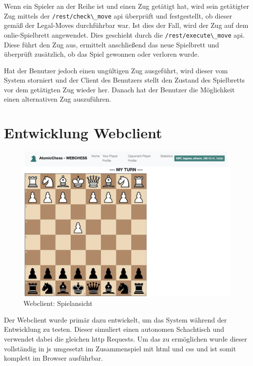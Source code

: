Wenn ein Spieler an der Reihe ist und einen Zug getätigt hat, wird sein
getätigter Zug mittels der \passthrough{\lstinline!/rest/check\_move!}
\gls{api} überprüft und festgestellt, ob dieser gemäß der Legal-Moves
durchführbar war. Ist dies der Fall, wird der Zug auf dem
onlie-Spielbrett angewendet. Dies geschieht durch die
\passthrough{\lstinline!/rest/execute\_move!} \gls{api}. Diese führt den
Zug aus, ermittelt anschließend das neue Spielbrett und überprüft
zusätzlich, ob das Spiel gewonnen oder verloren wurde.

Hat der Benutzer jedoch einen ungültigen Zug ausgeführt, wird dieser vom
System storniert und der Client des Benutzers stellt den Zustand des
Spielbretts vor dem getätigten Zug wieder her. Danach hat der Benutzer
die Möglichkeit einen alternativen Zug auszuführen.

\hypertarget{entwicklung-webclient}{%
\section{Entwicklung Webclient}\label{entwicklung-webclient}}

\begin{figure}
\centering
\includegraphics{images/ATC_webclient.png}
\caption{Webclient: Spielansicht \label{ATC_webclient}}
\end{figure}

Der Webclient wurde primär dazu entwickelt, um das System während der
Entwicklung zu testen. Dieser simuliert einen autonomen Schachtisch und
verwendet dabei die gleichen \gls{http} Requests. Um das zu ermöglichen
wurde dieser vollständig in \gls{js} umgesetzt im Zusammenspiel mit
\gls{html} und \gls{css} und ist somit komplett im Browser ausführbar.

